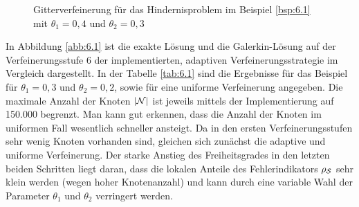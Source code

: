 \begin{bsp}
\begin{figure}[h]
\begin{center}
\hfill
{}
\end{center}
\caption{Gitterverfeinerung für das Hindernisproblem im Beispiel \ref{bsp:6.1} mit $\theta_1=0,4$ und $\theta_2=0,3$\label{abb:6.2}}
\end{figure}

In Abbildung \ref{abb:6.1} ist die exakte Lösung und die Galerkin-Lösung auf der Verfeinerungsstufe 6 der implementierten, adaptiven Verfeinerungsstrategie im Vergleich dargestellt. In der Tabelle \ref{tab:6.1} sind die Ergebnisse für das Beispiel für $\theta_1 = 0,3$ und $\theta_2 = 0,2$, sowie für eine uniforme Verfeinerung angegeben. Die maximale Anzahl der Knoten $\lvert \mathcal N\rvert$ ist jeweils mittels der Implementierung auf 150.000 begrenzt. Man kann gut erkennen, dass die Anzahl der Knoten im uniformen Fall wesentlich schneller ansteigt. Da in den ersten Verfeinerungsstufen sehr wenig Knoten vorhanden sind, gleichen sich zunächst die adaptive und uniforme Verfeinerung. Der starke Anstieg des Freiheitsgrades in den letzten beiden Schritten liegt daran, dass die lokalen Anteile des Fehlerindikators $\rho_{\mathcal S}$ sehr klein werden (wegen hoher Knotenanzahl) und kann durch eine variable Wahl der Parameter $\theta_1$ und $\theta_2$ verringert werden. 


\end{bsp}
